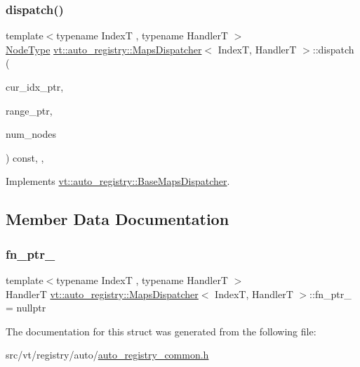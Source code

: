 \subsubsection{\texorpdfstring{dispatch()}{dispatch()}}
{\footnotesize\ttfamily template$<$typename IndexT , typename HandlerT $>$ \\
\hyperlink{namespacevt_a866da9d0efc19c0a1ce79e9e492f47e2}{Node\+Type} \hyperlink{structvt_1_1auto__registry_1_1_maps_dispatcher}{vt\+::auto\+\_\+registry\+::\+Maps\+Dispatcher}$<$ IndexT, HandlerT $>$\+::dispatch (\begin{DoxyParamCaption}\item[{\hyperlink{structvt_1_1index_1_1_base_index}{index\+::\+Base\+Index} $\ast$}]{cur\+\_\+idx\+\_\+ptr,  }\item[{\hyperlink{structvt_1_1index_1_1_base_index}{index\+::\+Base\+Index} $\ast$}]{range\+\_\+ptr,  }\item[{\hyperlink{namespacevt_a866da9d0efc19c0a1ce79e9e492f47e2}{Node\+Type}}]{num\+\_\+nodes }\end{DoxyParamCaption}) const\hspace{0.3cm}{\ttfamily [inline]}, {\ttfamily [override]}, {\ttfamily [virtual]}}



Implements \hyperlink{structvt_1_1auto__registry_1_1_base_maps_dispatcher_a36755202b288d1cb4eed6a57524b6398}{vt\+::auto\+\_\+registry\+::\+Base\+Maps\+Dispatcher}.



\subsection{Member Data Documentation}
\mbox{\label{structvt_1_1auto__registry_1_1_maps_dispatcher_a6538f72c68342ee7bad7a3b7a60a6aed}} 
\subsubsection{\texorpdfstring{fn\+\_\+ptr\+\_\+}{fn\_ptr\_}}
{\footnotesize\ttfamily template$<$typename IndexT , typename HandlerT $>$ \\
HandlerT \hyperlink{structvt_1_1auto__registry_1_1_maps_dispatcher}{vt\+::auto\+\_\+registry\+::\+Maps\+Dispatcher}$<$ IndexT, HandlerT $>$\+::fn\+\_\+ptr\+\_\+ = nullptr\hspace{0.3cm}{\ttfamily [private]}}



The documentation for this struct was generated from the following file\+:\begin{DoxyCompactItemize}
\item 
src/vt/registry/auto/\hyperlink{auto__registry__common_8h}{auto\+\_\+registry\+\_\+common.\+h}\end{DoxyCompactItemize}
